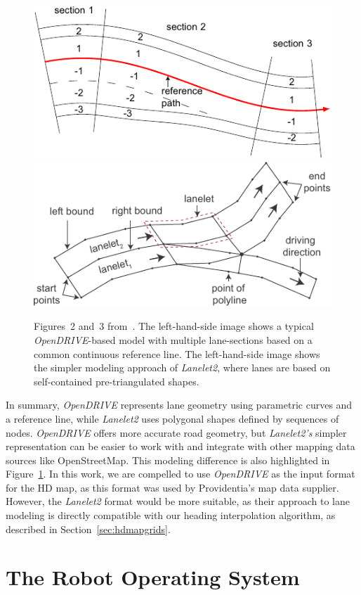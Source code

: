 \begin{figure}[htb]
    \includegraphics[width=0.49 \linewidth]{figures/opendrive_to_lanelet_fig_2_-cropped}
    \includegraphics[width=0.49 \linewidth]{figures/opendrive_to_lanelet_fig_3-cropped}
    \caption{Figures~2 and~3 from~\cite{althoff2018automatic}. The left-hand-side image shows a typical \textit{OpenDRIVE}-based model with multiple lane-sections based on a common continuous reference line. The left-hand-side image shows the simpler modeling approach of \textit{Lanelet2}, where lanes are based on self-contained pre-triangulated shapes.}
    \label{fig:opendrive-lanlet}
\end{figure}

In summary, \textit{OpenDRIVE} represents lane geometry using parametric curves and a reference line, while \textit{Lanelet2} uses polygonal shapes defined by sequences of nodes.
\textit{OpenDRIVE} offers more accurate road geometry, but \textit{Lanelet2's} simpler representation can be easier to work with and integrate with other mapping data sources like OpenStreetMap.
This modeling difference is also highlighted in Figure~\ref{fig:opendrive-lanlet}.
In this work, we are compelled to use \textit{OpenDRIVE} as the input format for the HD map, as this format was used by Providentia's map data supplier.
However, the \textit{Lanelet2} format would be more suitable, as their approach to lane modeling is directly compatible with our heading interpolation algorithm, as described in Section~\ref{sec:hdmapgrids}.


\section{The Robot Operating System}
\label{sec:ros}

